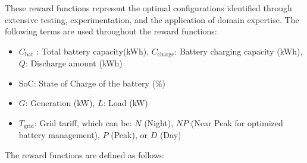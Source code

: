 \documentclass[preprint,12pt]{elsarticle}
\begin{document}

These reward functions represent the optimal configurations identified through extensive testing, experimentation, and the application of domain expertise. The following terms are used throughout the reward functions:

\begin{itemize}
    \item $C_{\text{bat}}$ : Total battery capacity(kWh), $C_{\text{charge}}$: Battery charging capacity (kWh), $Q$: Discharge amount (kWh)
    \item SoC: State of Charge of the battery (\%)
    \item $G$: Generation (kW), $L$: Load (kW)
    \item $T_{\text{grid}}$: Grid tariff, which can be:
        $N$ (Night), $NP$ (Near Peak for optimized battery management), $P$ (Peak), or $D$ (Day)
\end{itemize}

The reward functions are defined as follows:
\end{document}
